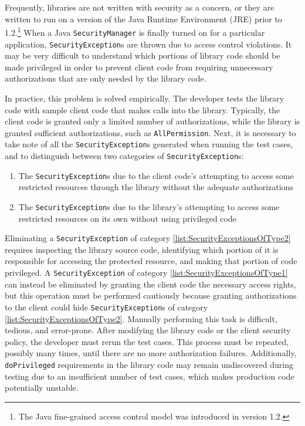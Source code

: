 Frequently, libraries are not written with security as a concern,
or they are written to run on a version of the Java Runtime
Environment (JRE) prior to 1.2.\footnote{The Java fine-grained
	access control model was introduced in version 1.2.} When a Java
\texttt{SecurityManager} is finally turned on for a particular
application, \texttt{SecurityException}s are thrown due to access
control violations. It may be very difficult to understand which
portions of library code should be made privileged in order to
prevent client code from requiring unnecessary authorizations that
are only needed by the library code.

In practice, this problem is solved empirically. The developer
tests the library code with sample client code that makes calls
into the library. Typically, the client code is granted only a
limited number of authorizations, while the library is granted
sufficient authorizations, such as \verb"AllPermission". Next, it
is necessary to take note of all the \verb"SecurityException"s
generated when running the test cases, and to distinguish between
two categories of \verb"SecurityException"s:
\begin{enumerate}
	\item The \verb"SecurityException"s due to the client code's attempting to
	access some restricted resources through the library without
	the adequate authorizations
	\label{list:SecurityExceptionsOfType1}
	\item The \verb"SecurityException"s due to the library's attempting
	to access some restricted resources on its own without using
	privileged code \label{list:SecurityExceptionsOfType2}
\end{enumerate}
Eliminating a \verb"SecurityException" of category
\ref{list:SecurityExceptionsOfType2} requires inspecting the
library source code, identifying which portion of it is
responsible for accessing the protected resource, and making that
portion of code privileged. A \verb"SecurityException" of category
\ref{list:SecurityExceptionsOfType1} can instead be eliminated by
granting the client code the necessary access rights, but this
operation must be performed cautiously because granting
authorizations to the client could hide \verb"SecurityException"s
of category \ref{list:SecurityExceptionsOfType2}. Manually
performing this task is difficult, tedious, and error-prone. After
modifying the library code or the client security policy, the
developer must rerun the test cases. This process must be
repeated, possibly many times, until there are no more
authorization failures. Additionally, \verb"doPrivileged"
requirements in the library code may remain undiscovered during
testing due to an insufficient number of test cases, which makes
production code potentially unstable.

